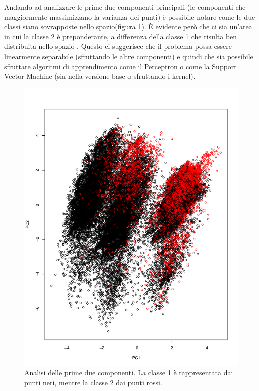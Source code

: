 \documentclass[fleqn,10pt]{SelfArx} %
\begin{document}
Andando ad analizzare le prime due componenti principali (le componenti che maggiormente massimizzano la varianza dei punti) è possibile notare come le due classi siano sovrapposte nello spazio(figura \ref{pca1}). È evidente però che ci sia un'area in cui la classe 2 è preponderante, a differenza della classe 1 che risulta ben distribuita nello spazio . Questo ci suggerisce che il problema possa essere linearmente separabile (sfruttando le altre componenti) e quindi che sia possibile sfruttare algoritmi di apprendimento come il Perceptron o come la Support Vector Machine (sia nella versione base o sfruttando i kernel).
\begin{figure}
\includegraphics[scale=0.30]{comp1_2.pdf}
\caption{\footnotesize{Analisi delle prime due componenti. La classe 1 è rappresentata dai punti neri, mentre la classe 2 dai punti rossi.}}
\label{pca1}
\end{figure}
\end{document}
